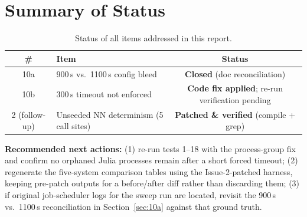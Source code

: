 \documentclass[11pt]{article}
\begin{document}
\section{Summary of Status}

\begin{table}[h]
\centering
\caption{Status of all items addressed in this report.}
\begin{tabular}{@{}clc@{}}
\toprule
\textbf{\#} & \textbf{Item} & \textbf{Status} \\
\midrule
10a & 900\,s vs.\ 1100\,s config bleed & \textbf{Closed} (doc reconciliation) \\
10b & 300\,s timeout not enforced & \textbf{Code fix applied}; re-run verification pending \\
2 (follow-up) & Unseeded NN determinism (5 call sites) & \textbf{Patched \& verified} (compile + grep) \\
\bottomrule
\end{tabular}
\end{table}

\noindent
\textbf{Recommended next actions:} (1) re-run tests 1--18 with the
process-group fix and confirm no orphaned Julia processes remain after a
short forced timeout; (2) regenerate the five-system comparison tables
using the Issue-2-patched harness, keeping pre-patch outputs for a
before/after diff rather than discarding them; (3) if original
job-scheduler logs for the sweep run are located, revisit the 900\,s vs.\
1100\,s reconciliation in Section~\ref{sec:10a} against that ground
truth.
\end{document}
